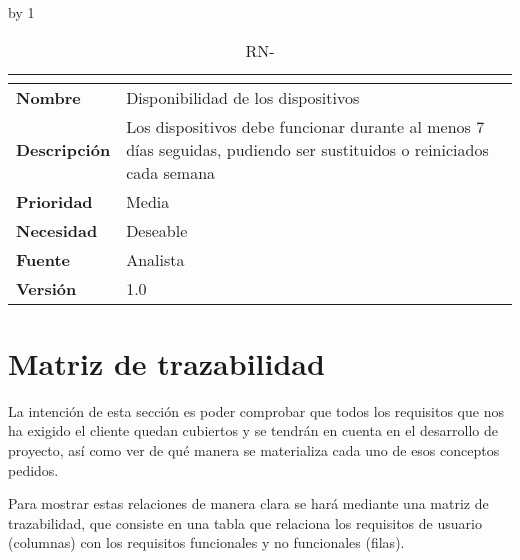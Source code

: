 \advance\rn by 1
\begin{table}[H]
	\caption{RN-\number\rn}
	\begin{tabular}{|l|p{}|}
		\hline
		\multicolumn{2}{|c|}{\cellcolor[HTML]{BFBFBF}{\color[HTML]{000000} \textbf{RN-\number\rn}}} \\ \hline
		\textbf{Nombre}      & Disponibilidad de los dispositivos                                                                                   \\ \hline
		\textbf{Descripción} & Los dispositivos debe funcionar durante al menos 7 días seguidas, pudiendo ser sustituidos o reiniciados cada semana \\ \hline
		\textbf{Prioridad}   & Media                                                                                                                \\ \hline
		\textbf{Necesidad}   & Deseable                                                                                                             \\ \hline
		\textbf{Fuente}      & Analista                                                                                                             \\ \hline
		\textbf{Versión}     & 1.0                                                                                                                  \\ \hline
	\end{tabular}
\end{table}
\pagebreak

\section{Matriz de trazabilidad}
La intención de esta sección es poder comprobar que todos los requisitos que nos ha exigido el cliente quedan cubiertos y se tendrán en cuenta en el desarrollo de proyecto, así como ver de qué manera se materializa cada uno de esos conceptos pedidos. 

Para mostrar estas relaciones de manera clara se hará mediante una matriz de trazabilidad, que consiste en una tabla que relaciona los requisitos de usuario (columnas) con los requisitos funcionales y no funcionales (filas).

